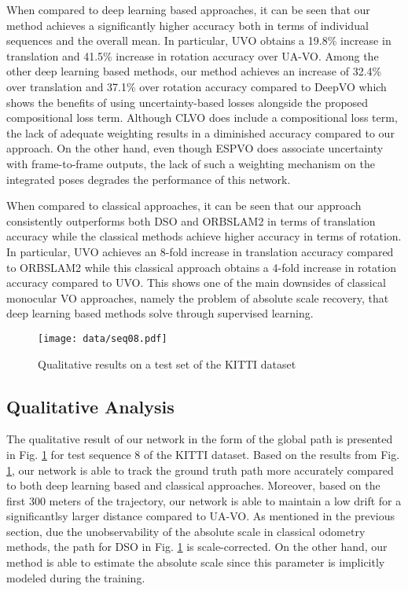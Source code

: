 \documentclass[letterpaper, 10 pt]{ieeeconf}  %
\begin{document}
When compared to deep learning based approaches, it can be seen that our method achieves a significantly higher accuracy both in terms of individual sequences and the overall mean. In particular, UVO obtains a 19.8\% increase in translation and 41.5\% increase in rotation accuracy over UA-VO. Among the other deep learning based methods, our method achieves an increase of 32.4\% over translation and 37.1\% over rotation accuracy compared to DeepVO which shows the benefits of using uncertainty-based losses alongside the proposed compositional loss term. Although CLVO does include a compositional loss term, the lack of adequate weighting results in a diminished accuracy compared to our approach. On the other hand, even though ESPVO does associate uncertainty with frame-to-frame outputs, the lack of such a weighting mechanism on the integrated poses degrades the performance of this network.

When compared to classical approaches, it can be seen that our approach consistently outperforms both DSO and ORBSLAM2 in terms of translation accuracy while the classical methods achieve higher accuracy in terms of rotation. In particular, UVO achieves an 8-fold increase in translation accuracy compared to ORBSLAM2 while this classical approach obtains a 4-fold increase in rotation accuracy compared to UVO. This shows one of the main downsides of classical monocular VO approaches, namely the problem of absolute scale recovery, that deep learning based methods solve through supervised learning.

\begin{figure}[t]%
    \centering
    \texttt{[image: data/seq08.pdf]}%
    \caption{Qualitative results on a test set of the KITTI dataset}
    \label{fig:qualitative}
    \vspace{-0.1cm}
\end{figure}

\subsection{Qualitative Analysis}
The qualitative result of our network in the form of the global path is presented in Fig. \ref{fig:qualitative} for test sequence 8 of the KITTI dataset. Based on the results from Fig. \ref{fig:qualitative}, our network is able to track the ground truth path more accurately compared to both deep learning based and classical approaches. Moreover, based on the first 300 meters of the trajectory, our network is able to maintain a low drift for a significantlsy larger distance compared to UA-VO. As mentioned in the previous section, due the unobservability of the absolute scale in classical odometry methods, the path for DSO in Fig. \ref{fig:qualitative} is scale-corrected. On the other hand, our method is able to estimate the absolute scale since this parameter is implicitly modeled during the training.
\end{document}
